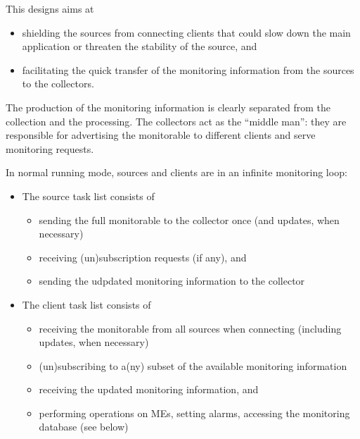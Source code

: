 \documentclass[a4paper]{cmspaper}
\begin{document}
This designs aims at
%
\begin{itemize}
\item{shielding the sources from connecting clients
that could slow down the main application or threaten the stability of
the source, and}
\item{facilitating the quick transfer of the monitoring
information from the sources to the collectors.} 
\end{itemize}
%
The production of the monitoring information is clearly separated from
the collection and the processing. The collectors act as the ``middle
man'': they are responsible for advertising the monitorable to
different clients and serve monitoring requests.

In normal running mode, sources and clients are in an infinite
monitoring loop:
%
\begin{itemize}
\item{
The source task list consists of 
\begin{itemize}
\item{sending the full monitorable to the collector once (and updates,
when necessary)}
\item{receiving (un)subscription requests (if any), and}
\item{sending the udpdated monitoring information to the collector}
\end{itemize}
}
\item{
The client task list consists of 
\begin{itemize}
\item{receiving the monitorable from all sources when connecting
(including updates, when necessary)}
\item{(un)subscribing to a(ny) subset of the available monitoring
information}
\item{receiving the updated monitoring information, and}
\item{performing operations on MEs, setting alarms,
accessing the monitoring database (see below)}
\end{itemize}
}
\end{itemize}
%
%
\end{document}
